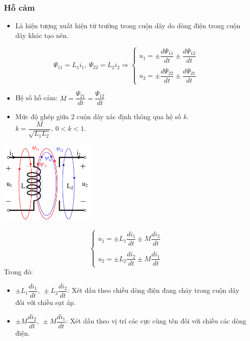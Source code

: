 \subsubsection{Hỗ cảm}
\begin{itemize}
  \item Là hiện tượng xuất hiện từ trường trong cuộn dây do dòng điện trong cuộn dây khác tạo nên.
\end{itemize}
\begin{equation}
  \Psi_{11} = L_1i_1,\ \Psi_{22} = L_2i_2 \Rightarrow 
  \begin{cases}
    u_1 = \pm\dfrac{d\Psi_{11}}{dt}\pm\dfrac{d\Psi_{12}}{dt} \\ \\
    u_2 = \pm\dfrac{d\Psi_{22}}{dt}\pm\dfrac{d\Psi_{21}}{dt} 
  \end{cases}
\end{equation}
\begin{itemize}
  \item Hệ số hỗ cảm: $M = \dfrac{\Psi_{21}}{dt} = \dfrac{\Psi_{12}}{dt}$
  \item Mức độ ghép giữa 2 cuộn dây xác định thông qua hệ số $k$. $k = \dfrac{M}{\sqrt{L_1L_2}},\ 0<k<1$.
\end{itemize}
\begin{center}
  \includegraphics[width=0.35\textwidth]{./image/7.png}
\end{center}
\begin{equation}
  \begin{cases}
    u_1 = \pm L_1\dfrac{di_1}{dt}\pm M\dfrac{di_2}{dt} \\ \\
    u_2 = \pm L_2\dfrac{di_2}{dt}\pm M\dfrac{di_1}{dt}
  \end{cases}
\end{equation}
Trong đó:
\begin{itemize}
  \item $\pm L_1\dfrac{di_1}{dt},\ \pm L_2\dfrac{di_2}{dt}$: Xét dấu theo chiều dòng điện đang chảy trong cuộn dây đối với chiều sụt áp.
  \item $\pm M\dfrac{di_2}{dt},\ \pm M\dfrac{di_1}{dt}$: Xét dấu theo vị trí các cực cùng tên đối với chiều các dòng điện.
\end{itemize}
